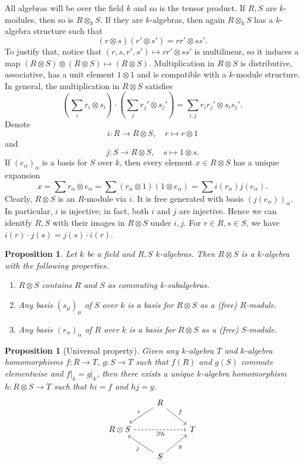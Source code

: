 \documentclass[10pt, a4paper]{article}
\newtheorem{proposition}[thm]{Proposition}
\begin{document}
All algebras will be over the field $k$ and so is the tensor product.
If $R, S$ are $k$-modules, then so is $R \otimes_k S$. If they are $k$-algebras, then again 
$R \otimes_k S$ has a $k$-algebra structure such that 
$$(r \otimes s) (r' \otimes s') = rr' \otimes ss'.$$
To justify that, notice that $(r, s, r', s') \mapsto rr' \otimes ss'$
is multilinear, so it induces a map $(R \otimes S) \otimes (R \otimes S) \mapsto (R \otimes S)$.
Multiplication in $R \otimes S$ is distributive, associative, has a unit element $1 \otimes 1$
and is compatible with a $k$-module structure.
In general, the multiplication in $R \otimes S$ satisfies
$$\left(\sum_i r_i \otimes s_i\right) \cdot \left(\sum_j r_j ' \otimes s_j '\right) = \sum_{i, j} r_i r_j' \otimes s_i s_j'.$$
Denote 
$$i: R \to R \otimes S,\quad r \mapsto r \otimes 1$$
and 
$$j: S \to R \otimes S,\quad s \mapsto 1 \otimes s.$$
If $(e_\alpha)_\alpha$ is a basis for $S$ over $k$, then every element $x \in R \otimes S$ 
has a unique expansion
$$x = \sum r_\alpha \otimes e_\alpha = \sum (r_\alpha \otimes 1) (1 \otimes e_\alpha) = \sum i(r_\alpha) j(e_\alpha).$$
Clearly, $R \otimes S$ is an $R$-module via $i$. It is free generated with basis $(j(e_{\alpha}))_{\alpha}$.
In particular, $i$ is injective; in fact, both $i$ and $j$ are injective.
Hence we can idenitfy $R, S$ with their images in $R \otimes S$ under $i, j$.
For $r \in R, s \in S$, we have $i(r) \cdot j(s) = j(s) \cdot i(r)$.

\begin{proposition}
  Let $k$ be a field and $R, S$ $k$-algebras. Then $R \otimes S$ is a $k$-algebra with the following properties.
  \begin{enumerate}
    \item $R \otimes S$ contains $R$ and $S$ as commuting $k$-subalgebras.
    \item Any basis $(s_{\mu})_\mu$ of $S$ over $k$ is a basis for $R \otimes S$ as a (free) $R$-module.
    \item Any basis $(r_{\alpha})_\alpha$ of $R$ over $k$ is a basis for $R \otimes S$ as a (free) $S$-module.
  \end{enumerate}
\end{proposition}

\begin{proposition}[Universal property]
  Given any $k$-algebra $T$ and $k$-algebra homomorphisms $f: R \to T$, $g: S \to T$
  such that $f(R)$ and $g(S)$ commute elementwise and $f\big|_k = g \big|_k$,
  then there exists a unique $k$-algebra homomorphism $h: R \otimes S \to T$ such that
  $hi = f$ and $hj = g$.
  \[\begin{tikzcd}
    & R \\
    {R \otimes S} && T \\
    & S
    \arrow["i"', from=1-2, to=2-1]
    \arrow["j", from=3-2, to=2-1]
    \arrow["f", from=1-2, to=2-3]
    \arrow["g"', from=3-2, to=2-3]
    \arrow["{\exists! h}"', dashed, from=2-1, to=2-3]
  \end{tikzcd}\]
\end{proposition}
\end{document}
